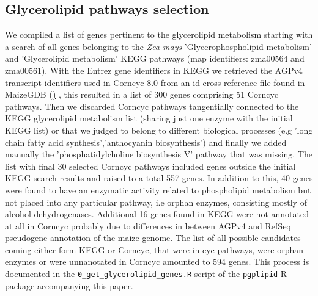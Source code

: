 \documentclass[9pt,twocolumn,twoside]{BioRxiv}
\begin{document}
\subsection{Glycerolipid pathways selection}
We compiled a list of genes pertinent to the glycerolipid metabolism starting with a search of all genes belonging to the \textit{Zea mays} 'Glycerophospholipid metabolism' and 'Glycerolipid metabolism' KEGG pathways \cite{kanehisa2019} (map identifiers: zma00564 and zma00561). 
With the Entrez gene identifiers in KEGG we retrieved the AGPv4 transcript identifiers used in Corncyc 8.0 \cite{portwood2019, walsh2016} from an id cross reference file found in MaizeGDB (\href{https://www.maizegdb.org/search/gene/download_gene_xrefs.php?relative=v4}) \cite{portwood2019}, this resulted in a list of 300 genes comprising 51 Corncyc pathways. 
Then we discarded Corncyc pathways  tangentially connected to the KEGG glycerolipid metabolism list (sharing just one enzyme with the initial KEGG list) or that we judged to belong to different biological processes (e.g 'long chain fatty acid synthesis','anthocyanin biosynthesis') and finally we added manually the 'phosphatidylcholine biosynthesis V' pathway that was missing. 
The list with final 30 selected Corncyc pathways included genes outside the initial KEGG search results and raised to a total 557 genes. 
In addition to this, 40 genes were found to have an enzymatic activity related to phospholipid metabolism but not placed into any particular pathway, i.e orphan enzymes, consisting mostly of alcohol dehydrogenases. 
Additional 16 genes found in KEGG were not annotated at all in Corncyc probably due to differences in between AGPv4 and RefSeq pseudogene annotation of the maize genome. 
The list of all possible candidates coming either form KEGG or Corncyc, that were in cyc pathways, were orphan enzymes or were unnanotated in Corncyc amounted to 594 genes. This process is documented in the \verb|0_get_glycerolipid_genes.R| script of the \verb|pgplipid| R package accompanying this paper.
\end{document}
